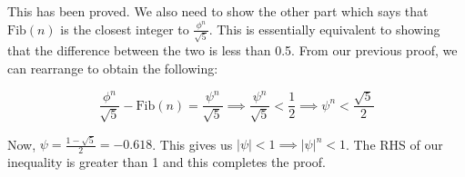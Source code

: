 \documentclass[a4paper]{article}
\begin{document}
	This has been proved. We also need to show the other part which says that $\text{Fib}(n)$ is the closest integer to $\frac{\phi^n}{\sqrt{5}}$. This is essentially equivalent to showing that the difference between the two is less than 0.5. From our previous proof, we can rearrange to obtain the following:
	
	\[\frac{\phi^n}{\sqrt{5}}-\text{Fib}(n)=\frac{\psi^n}{\sqrt{5}}\implies\frac{\psi^n}{\sqrt{5}}<\frac{1}{2}\implies\psi^n<\frac{\sqrt{5}}{2}\]
	
	Now, $\psi=\frac{1-\sqrt{5}}{2}=-0.618$. This gives us $|\psi|<1\implies|\psi|^n<1$. The RHS of our inequality is greater than 1 and this completes the proof.
\end{document}
